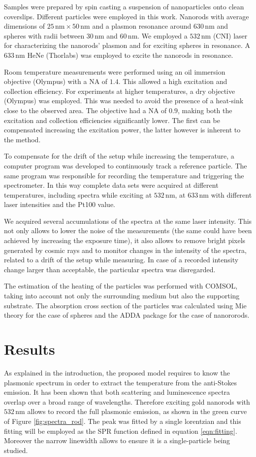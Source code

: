 \documentclass[journal=nalefd,manuscript=letter]{achemso}
\newcommand{\nm}{\ensuremath{\,\textrm{nm}}}
\begin{document}
Samples were prepared by spin casting a suspension of nanoparticles onto clean
coverslips. Different particles were employed in this work. Nanorods with 
average dimensions of $25\nm\times50\nm$ and a plasmon resonance around $630\nm$
and spheres with radii between $30\nm$ and $60\nm$. We employed a $532\nm$ (CNI)
laser for characterizing the nanorods' plasmon and for exciting spheres in
resonance. A $633\nm$ HeNe (Thorlabs) was employed to excite the nanorods in
resonance. 

Room temperature measurements were performed using an oil immersion objective
(Olympus) with a NA of $1.4$. This allowed a high excitation and collection
efficiency. For experiments at higher temperatures, a dry objective (Olympus)
was employed. This was needed to avoid the presence of a heat-sink close to the
observed area. The objective had a NA of $0.9$, making both the excitation and
collection efficiencies significantly lower. The first can be compensated
increasing the excitation power, the latter however is inherent to the method. 

To compensate for the drift of the setup while increasing the temperature, a
computer program was developed to continuously track a reference particle. The
same program was responsible for recording the temperature and triggering the
spectrometer. In this way complete data sets were acquired at different
temperatures, including spectra while exciting at $532\nm$, at $633\nm$ with
different laser intensities and the Pt100 value. 

We acquired several accumulations of the spectra at the same laser intensity.
This not only allows to lower the noise of the measurements (the same could
have been achieved by increasing the exposure time), it also allows to remove
bright pixels generated by cosmic rays and to monitor changes in the intensity
of the spectra, related to a drift of the setup while measuring. In case of a
recorded intensity change larger than acceptable, the particular spectra was
disregarded.

The estimation of the heating of the particles was performed with COMSOL, taking
into account not only the surrounding medium but also the supporting substrate.
The absorption cross section of the particles was calculated using Mie theory
for the case of spheres and the ADDA package for the case of nanororods. 

\section{Results}
As explained in the introduction, the proposed model requires to know the
plasmonic spectrum in order to extract the temperature from the anti-Stokes
emission. It has been shown that both scattering and luminescence spectra
overlap over a broad range of wavelengths. Therefore exciting gold nanorods with
$532\nm$ allows to record the full plasmonic emission, as shown in the
green curve of Figure \ref{fig:spectra_rod}. The peak was fitted by a single
lorentzian and this fitting will be employed as the SPR function defined in
equation \ref{eqn:fitting}. Moreover the narrow linewidth allows to ensure it is
a single-particle being studied. 
\end{document}
